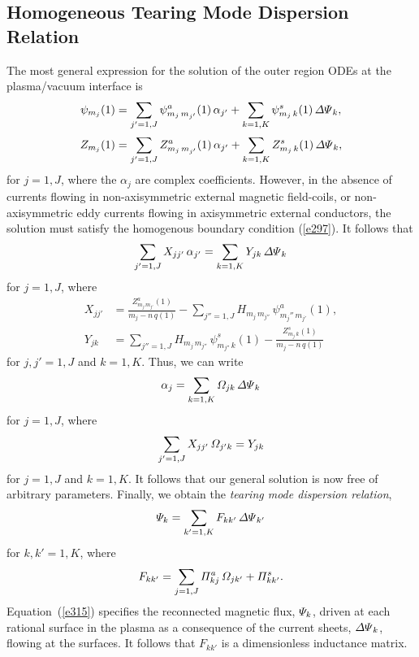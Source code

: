 \documentclass[12pt,prb,aps]{revtex4-1}
\begin{document}
\subsection{Homogeneous Tearing Mode Dispersion Relation}
The most general expression for the solution of the outer region ODEs at the plasma/vacuum interface is
\begin{align}
\psi_{m_j}(1) &= \sum_{j'=1,J}\psi_{m_j\,m_{j'}}^a(1)\,\alpha_{j'} + \sum_{k=1,K}\psi_{m_j\,k}^s(1)\,{\mit\Delta\Psi}_k,\\[0.5ex]
Z_{m_j}(1) &= \sum_{j'=1,J}Z_{m_j\,m_{j'}}^a(1)\,\alpha_{j'} + \sum_{k=1,K}Z_{m_j\,k}^s(1)\,{\mit\Delta\Psi}_k,
\end{align}
for $j=1,J$, where the $\alpha_j$ are complex coefficients. However, in the absence of currents flowing in non-axisymmetric external
magnetic field-coils, or non-axisymmetric eddy currents flowing in axisymmetric external conductors, the solution must satisfy the homogenous boundary condition (\ref{e297}). 
It follows that
\begin{equation}
\sum_{j'=1,J}X_{jj'}\,\alpha_{j'} = \sum_{k=1,K}Y_{jk}\,{\mit\Delta\Psi}_k
\end{equation}
for $j=1,J$, where
\begin{align}
X_{jj'} &=\frac{Z^a_{m_j\,m_{j'}}(1)}{m_j-n\,q(1)}-\sum_{j''=1,J} H_{m_j\,m_{j''}}\,\psi^a_{m_j''\,m_{j'}}(1),\\[0.5ex]
Y_{jk} &= \sum_{j''=1,J}H_{m_j\,m_{j''}}\,\psi_{m_{j''}\,k}^s(1)-\frac{Z^s_{m_j\,k}(1)}{m_j-n\,q(1)}
\end{align}
for $j,j'=1,J$ and $k=1,K$. Thus, we can write
\begin{equation}
\alpha_j = \sum_{k=1,K}{\mit\Omega}_{jk}\,{\mit\Delta\Psi}_k
\end{equation}
for $j=1,J$, 
where
\begin{equation}
\sum_{j'=1,J}X_{jj'}\,{\mit\Omega}_{j'k} = Y_{jk}
\end{equation}
for $j=1,J$ and $k=1,K$. It follows that our general solution is now free of arbitrary parameters.
 Finally, we obtain the {\em tearing mode dispersion relation},\cite{connor,cht,am1,pletz}
\begin{equation}\label{e315}
{\mit\Psi}_k = \sum_{k'=1,K}F_{kk'}\,{\mit\Delta\Psi}_{k'}
\end{equation}
for $k,k'=1,K$, where
\begin{equation}
F_{kk'}=\sum_{j=1,J}{\mit\Pi}^a_{kj}\,{\mit\Omega}_{jk'} + {\mit\Pi}^s_{kk'}.
\end{equation}
Equation~(\ref{e315}) specifies the reconnected magnetic flux, ${\mit\Psi}_k$, driven at each rational surface in the plasma
as a consequence of the current sheets, ${\mit\Delta\Psi}_k$, flowing at the surfaces. It follows that $F_{kk'}$ is a dimensionless
inductance matrix.\cite{rfbook}
\end{document}

